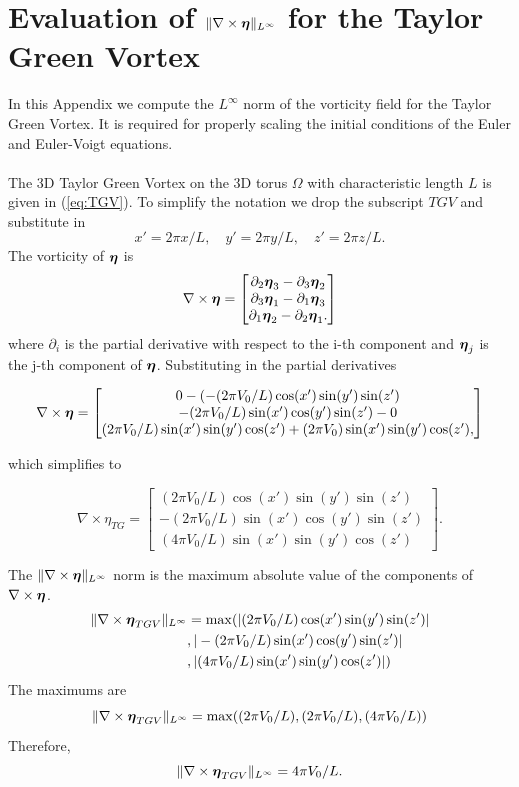 \chapter{Evaluation of $\|\nabla\times{\boldsymbol \eta}\|_{L^\infty}$ for the Taylor Green Vortex}
\label{app:tg:vorticity:general}

In this Appendix we compute the $L^\infty$ norm of the vorticity field for the Taylor Green Vortex. It is required for properly scaling the initial conditions of the Euler and Euler-Voigt equations.
\\~\\
The 3D Taylor Green Vortex on the 3D torus $\Omega$ with characteristic length $L$ is given in (\ref{eq:TGV}). To simplify the notation we drop the subscript $TGV$ and substitute in
$$x' = 2\pi x/L, \quad y' = 2\pi y/L, \quad z' = 2\pi z/L.$$
The vorticity of ${\boldsymbol \eta}$ is
$$\nabla \times {\boldsymbol \eta} = \begin{bmatrix}
           \partial_2{\boldsymbol \eta}_3 - \partial_3{\boldsymbol \eta}_2 \\
           \partial_3{\boldsymbol \eta}_1 - \partial_1{\boldsymbol \eta}_3 \\
           \partial_1{\boldsymbol \eta}_2 - \partial_2{\boldsymbol \eta}_1.
         \end{bmatrix}$$
where $\partial_i$ is the partial derivative with respect to the i-th component and ${\boldsymbol \eta}_j$ is the j-th component of ${\boldsymbol \eta}$. Substituting in the partial derivatives
\\
\begin{small}
$$\nabla \times {\boldsymbol \eta} = \begin{bmatrix}
           0 - (-(2\pi V_0/L)\cos(x')\sin(y')\sin(z') \\
           -(2\pi V_0/L) \sin(x')\cos(y')\sin(z') - 0\\
           (2\pi V_0/L)\sin(x')\sin(y')\cos(z') + (2\pi V_0)\sin(x')\sin(y')\cos(z'),
         \end{bmatrix}$$
\end{small}
which simplifies to 
\begin{small}
$$\nabla \times \eta_{TG} = \begin{bmatrix}
           (2\pi V_0/L) \cos(x')\sin(y')\sin(z') \\
           -(2\pi V_0/L) \sin(x')\cos(y')\sin(z')\\
           (4\pi V_0/L)\sin(x')\sin(y')\cos(z')
         \end{bmatrix}.$$
\end{small}
The $\|\nabla \times {\boldsymbol \eta}\|_{L^{\infty}}$ norm is the maximum absolute value of the components of $\nabla \times {\boldsymbol \eta}$. 
\begin{align*}
\|\nabla \times {\boldsymbol \eta}_{TGV}\|_{L^{\infty}} &= \max( \vert(2\pi V_0/L) \cos(x')\sin(y')\sin(z')\vert \\
&, \vert-(2\pi V_0/L) \sin(x')\cos(y')\sin(z')\vert \\
&, \vert(4\pi V_0/L)\sin(x')\sin(y')\cos(z')\vert)
\end{align*}
The maximums are
\begin{equation*}
\|\nabla \times {\boldsymbol \eta}_{TGV}\|_{L^{\infty}} = \max( (2\pi V_0/L), (2\pi V_0/L), (4\pi V_0/L))
\end{equation*}
Therefore,
$$\|\nabla \times {\boldsymbol \eta}_{TGV}\|_{L^{\infty}} = 4\pi V_0/L.$$